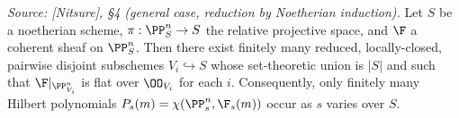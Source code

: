 \begin{lemma}
  \label{lem:nonflat_locus_proper}

  \textit{Source: [Nitsure], \S4 (general case, reduction by Noetherian induction).}
  Let \(S\) be a noetherian scheme, \(\pi : \PP^n_S \to S\) the relative projective
  space, and \(\F\) a coherent sheaf on \(\PP^n_S\).  Then there exist finitely many
  reduced, locally-closed, pairwise disjoint subschemes \(V_i \hookrightarrow S\)
  whose set-theoretic union is \(|S|\) and such that \(\F|_{\PP^n_{V_i}}\) is
  flat over \(\OO_{V_i}\) for each \(i\). Consequently, only finitely many
  Hilbert polynomials \(P_s(m) = \chi(\PP^n_s, \F_s(m))\) occur as \(s\) varies
  over \(S\).
\end{lemma}

